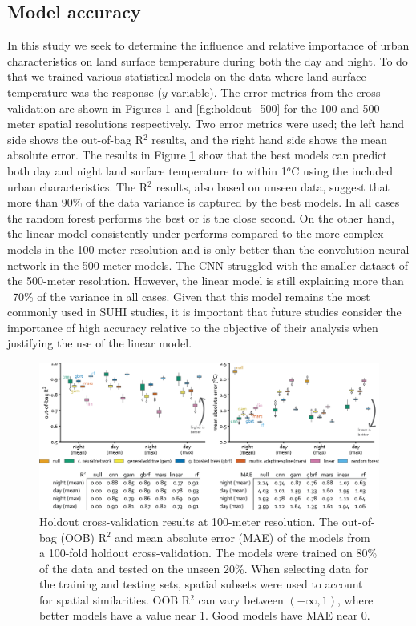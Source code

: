 \documentclass[final,3p,times,onecolumn,sort&compress]{elsarticle}
\begin{document}
\subsection{Model accuracy}
In this study we seek to determine the influence and relative importance of urban characteristics on land surface temperature during both the day and night.
To do that we trained various statistical models on the data where land surface temperature was the response ($y$ variable).
The error metrics from the cross-validation are shown in Figures \ref{fig:holdout_100} and \ref{fig:holdout_500} for the 100 and 500-meter spatial resolutions respectively.
Two error metrics were used; the left hand side shows the out-of-bag R$^2$ results, and the right hand side shows the mean absolute error.
The results in Figure \ref{fig:holdout_100} show that the best models can predict both day and night land surface temperature to within 1$^o$C using the included urban characteristics.
The R$^2$ results, also based on unseen data, suggest that more than 90\% of the data variance is captured by the best models.
In all cases the random forest performs the best or is the close second.
On the other hand, the linear model consistently under performs compared to the more complex models in the 100-meter resolution and is only better than the convolution neural network in the 500-meter models.
The CNN struggled with the smaller dataset of the 500-meter resolution.
However, the linear model is still explaining more than ~70\% of the variance in all cases.
Given that this model remains the most commonly used in SUHI studies, it is important that future studies consider the importance of high accuracy relative to the objective of their analysis when justifying the use of the linear model.

\begin{figure}
    \centering
    \includegraphics[width=\linewidth]{fig/report/holdout_100.png}
    \caption[Holdout cross-validation results at 100-meter resolution]{
    Holdout cross-validation results at 100-meter resolution.
    The out-of-bag (OOB) R$^2$ and mean absolute error (MAE) of the models from a 100-fold holdout cross-validation. 
    The models were trained on 80\% of the data and tested on the unseen 20\%.
    When selecting data for the training and testing sets, spatial subsets were used to account for spatial similarities. 
    OOB R$^2$ can vary between $(-\infty, 1)$, where better models have a value near 1. 
    Good models have MAE near 0.
    }
    \label{fig:holdout_100}
\end{figure}
\end{document}
